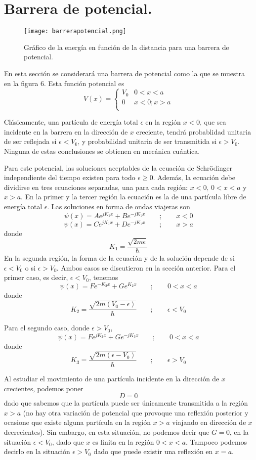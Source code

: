 \documentclass[12pt,a4paper]{article}
\def\e{{\epsilon}} %
\begin{document}
\section{Barrera de potencial.}

\begin{figure}[ht!]
\begin{center}
\texttt{[image: barrerapotencial.png]}
\caption{Gráfico de la energía en función de la distancia para una barrera de potencial.}
\end{center}
\end{figure}

En esta sección se considerará una barrera de potencial como la que se muestra en la figura 6. Esta función potencial es
\[
V(x)=
\left\{
\begin{array}{ll}
V_{0} & 0<x<a \\
0 & x<0;x>a \\
\end{array}
\right.
\]

Clásicamente, una partícula de energía total $\e$ en la región $x<0$, que sea incidente en la barrera en la dirección de $x$ creciente, tendrá probablidad unitaria de ser reflejada si $\e<V_{0}$, y probabilidad unitaria de ser transmitida si $\e>V_{0}$. Ninguna de estas conclusiones se obtienen en mecánica cuántica.

Para este potencial, las soluciones aceptables de la ecuación de Schrödinger independiente del tiempo existen para todo $\e \geq 0$. Además, la ecuación debe dividirse en tres ecuaciones separadas, una para cada región: $x<0$, $0<x<a$ y $x>a$. En la primer y la tercer región la ecuación es la de una partícula libre de energía total $\e$. Las soluciones en forma de ondas viajeras son
\[ \psi (x)=Ae^{jK_{1}x}+Be^{-jK_{1}x} \qquad ; \qquad x<0 \]
\[ \psi (x)=Ce^{jK_{1}x}+De^{-jK_{1}x} \qquad ; \qquad x>a \]
donde
\[ K_{1}=\frac{\sqrt{2m\e}}{\hbar} \]
En la segunda región, la forma de la ecuación y de la solución depende de si $\e <V_{0}$ o si $\e>V_{0}$. Ambos casos se discutieron en la sección anterior. Para el primer caso, es decir, $\e<V_{0}$, tenemos
\[ \psi (x)=Fe^{-K_{2}x}+Ge^{K_{2}x} \qquad ; \qquad 0<x<a \]
donde
\[ K_{2}=\frac{\sqrt{2m(V_{0}-\e)}}{\hbar} \qquad ; \qquad \e <V_{0} \]

Para el segundo caso, donde $\e >V_{0}$,
\[ \psi (x)=Fe^{jK_{3}x}+Ge^{-jK_{3}x} \qquad ; \qquad 0<x<a \]
donde
\[ K_{3}=\frac{\sqrt{2m(\e -V_{0})}}{\hbar} \qquad ; \qquad \e > V_{0} \]

Al estudiar el movimiento de una partícula incidente en la dirección de $x$ crecientes, podemos poner
\[ D=0 \]
dado que sabemos que la partícula puede ser únicamente transmitida a la región $x>a$ (no hay otra variación de potencial que provoque una reflexión posterior y ocasione que existe alguna partícula en la región $x>a$ viajando en dirección de $x$ decrecientes). Sin embargo, en esta situación, no podemos decir que $G=0$, en la situación $\e<V_{0}$, dado que $x$ es finita en la región $0<x<a$. Tampoco podemos decirlo en la situación $\e>V_{0}$ dado que puede existir una reflexión en $x=a$.
\end{document}
